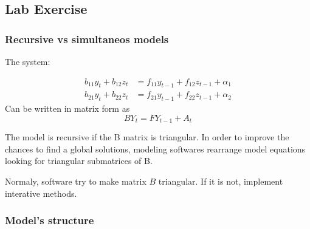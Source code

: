 \documentclass[11pt]{article}
\begin{document}
\subsection*{Lab Exercise}
\label{sec:org181566e}


\subsubsection*{Recursive vs simultaneos models}
\label{sec:orga71fb0e}


The system:

\begin{align*}
 b_{11}y_{t} + b_{12}z_{t} & = f_{11}y_{t-1} + f_{12}z_{t-1} + \alpha_{1}\\
 b_{21}y_{t} + b_{22}z_{t} & = f_{21}y_{t-1} + f_{22}z_{t-1} + \alpha_{2}
\end{align*}
Can be written in matrix form as
\[BY_{t} = FY_{t-1} + A_{t}\]

The model is recursive if the B matrix is triangular.
In order to improve the chances to find a global solutions, modeling softwares rearrange model equations looking for triangular submatrices of B.

Normaly, software try to make matrix \(B\) triangular.
If it is not, implement interative methods.

\subsubsection*{Model's structure}
\label{sec:org222458c}
\end{document}
